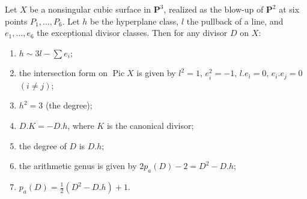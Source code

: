 Let $X$ be a nonsingular cubic surface in $\mathbf{P}^3$, realized as the blow-up of $\mathbf{P}^2$ at six points $P_1, \ldots, P_6$. Let $h$ be the hyperplane class, $l$ the pullback of a line, and $e_1, \ldots, e_6$ the exceptional divisor classes. Then for any divisor $D$ on $X$:
\begin{enumerate}
\item[(a)] $h \sim 3l - \sum e_i$;
\item[(b)] the intersection form on $\operatorname{Pic} X$ is given by $l^2 = 1$, $e_i^2 = -1$, $l.e_i = 0$, $e_i.e_j = 0$ $(i \neq j)$;
\item[(c)] $h^2 = 3$ (the degree);
\item[(d)] $D.K = -D.h$, where $K$ is the canonical divisor;
\item[(e)] the degree of $D$ is $D.h$;
\item[(f)] the arithmetic genus is given by $2p_a(D) - 2 = D^2 - D.h$;
\item[(g)] $p_a(D) = \frac{1}{2}(D^2 - D.h) + 1$.
\end{enumerate}
